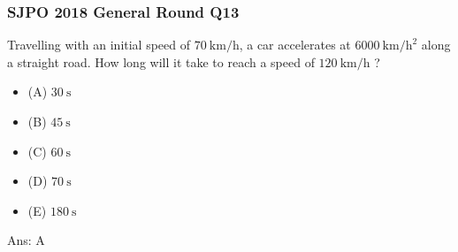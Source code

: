 \documentclass{article}
\begin{document}
\subsubsection{SJPO 2018 General Round Q13}
Travelling with an initial speed of $70 \mathrm{~km} / \mathrm{h}$, a car accelerates at $6000 \mathrm{~km} / \mathrm{h}^2$ along a straight road. How long will it take to reach a speed of $120 \mathrm{~km} / \mathrm{h}$ ?
\begin{itemize}
\item[] (A) $30 \mathrm{~s}$
\item[] (B) $45 \mathrm{~s}$
\item[] (C) $60 \mathrm{~s}$
\item[] (D) $70 \mathrm{~s}$
\item[] (E) $180 \mathrm{~s}$
\end{itemize}
Ans: \ifpaper A \fi
\end{document}
